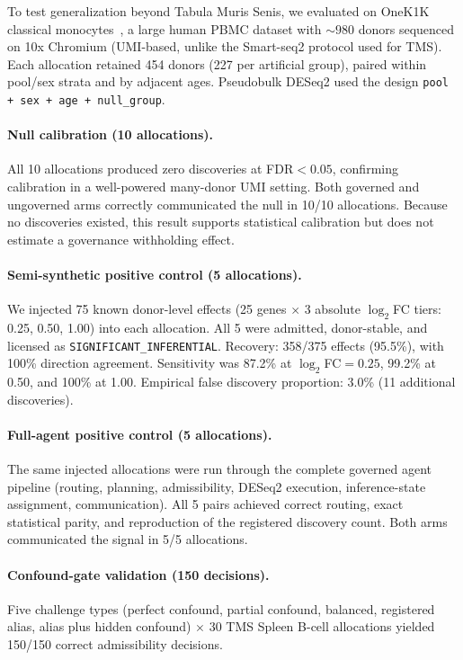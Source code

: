 \documentclass[pmlr,twocolumn,10pt]{jmlr}
\begin{document}
To test generalization beyond Tabula Muris Senis, we evaluated on OneK1K
classical monocytes~\citep{yazar2022}, a large human PBMC dataset with
${\sim}980$ donors sequenced on 10x Chromium (UMI-based, unlike the Smart-seq2
protocol used for TMS). Each allocation retained 454 donors (227 per artificial
group), paired within pool/sex strata and by adjacent ages. Pseudobulk DESeq2
used the design \texttt{pool + sex + age + null\_group}.

\paragraph{Null calibration (10 allocations).}
All 10 allocations produced zero discoveries at FDR${<}0.05$, confirming
calibration in a well-powered many-donor UMI setting. Both governed and
ungoverned arms correctly communicated the null in 10/10 allocations. Because
no discoveries existed, this result supports statistical calibration but does
not estimate a governance withholding effect.

\paragraph{Semi-synthetic positive control (5 allocations).}
We injected 75 known donor-level effects (25 genes $\times$ 3 absolute
$\log_2$FC tiers: 0.25, 0.50, 1.00) into each allocation. All 5 were
admitted, donor-stable, and licensed as \texttt{SIGNIFICANT\_INFERENTIAL}.
Recovery: 358/375 effects (95.5\%), with 100\% direction agreement. Sensitivity
was 87.2\% at $\log_2$FC${=}0.25$, 99.2\% at 0.50, and 100\% at 1.00.
Empirical false discovery proportion: 3.0\% (11 additional discoveries).

\paragraph{Full-agent positive control (5 allocations).}
The same injected allocations were run through the complete governed agent
pipeline (routing, planning, admissibility, DESeq2 execution, inference-state
assignment, communication). All 5 pairs achieved correct routing,
exact statistical parity, and reproduction of the registered discovery
count. Both arms communicated the signal in 5/5 allocations.

\paragraph{Confound-gate validation (150 decisions).}
Five challenge types (perfect confound, partial confound, balanced, registered
alias, alias plus hidden confound) $\times$ 30 TMS Spleen B-cell allocations
yielded 150/150 correct admissibility decisions.
\end{document}

